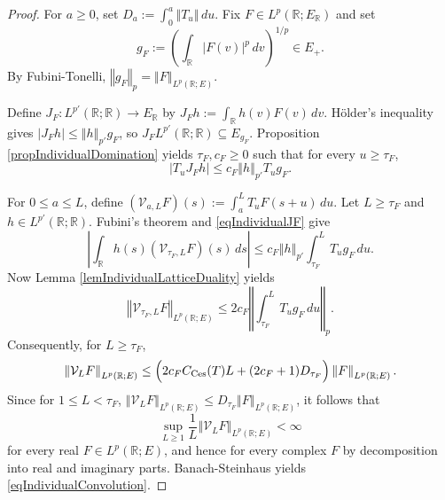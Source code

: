 \documentclass[12pt]{amsart}
\theoremstyle{plain}
\theoremstyle{remark}
\theoremstyle{definition}
\newcommand{\R}{\mathbb{R}}
\newcommand{\norm}[1]{\left\Vert #1\right\Vert}
\begin{document}
	\begin{proof}
		For $a\ge0$, set $D_a:=\int_0^a\norm{T_u}\,du$. Fix $F\in L^p(\R;E_{\R})$ and set 
		\[g_F := \left( \int_{\R}|F(v)|^p\,dv \right)^{1/p} \in E_+.
		\]
		By Fubini-Tonelli, $\norm{g_F}_p=\norm{F}_{L^p(\R;E)}$. 
		
		Define $J_F:L^{p'}(\R;\R)\longrightarrow E_{\R}$ by $J_Fh:=\int_{\R}h(v)F(v)\,dv$. H\"older's inequality gives $|J_Fh| \le \norm{h}_{p'}g_F$, so $J_FL^{p'}(\R;\R)\subseteq E_{g_F}$. Proposition \ref{propIndividualDomination} yields $\tau_F,c_F\ge0$ such that for every $u\ge \tau_F$,
		\begin{equation}\label{eqIndividualJF}
			|T_uJ_Fh| \le c_F\norm{h}_{p'}T_ug_F.
		\end{equation}
		
		For $0\le a\le L$, define $(\mathcal V_{a,L}F)(s) := \int_a^L T_uF(s+u)\,du$. Let $L\ge\tau_F$ and $h\in L^{p'}(\R;\R)$. Fubini's theorem and \eqref{eqIndividualJF} give
		\[
		\left| \int_{\R}h(s)(\mathcal V_{\tau_F,L}F)(s)\,ds \right| \le c_F\norm{h}_{p'} \int_{\tau_F}^L T_ug_F\,du.
		\]
		Now Lemma \ref{lemIndividualLatticeDuality}  yields
		\[
		\norm{\mathcal V_{\tau_F,L}F}_{L^p(\R;E)} \le 2c_F \norm{\int_{\tau_F}^L T_ug_F\,du}_p.
		\]
		Consequently, for $L\ge\tau_F$,
		\[
		\norm{\mathcal V_LF}_{L^p(\R;E)} \le \Bigl( 2c_F C_{\mathrm{Ces}}(T)L + (2c_F+1)D_{\tau_F} \Bigr) \norm{F}_{L^p(\R;E)}.
		\]
		Since for $1\le L<\tau_F$, $\norm{\mathcal V_LF}_{L^p(\R;E)} \le D_{\tau_F}\norm{F}_{L^p(\R;E)}$, it follows that \[
		\sup_{L\ge1} \frac1L \norm{\mathcal V_LF}_{L^p(\R;E)} < \infty
		\]
		for every real $F\in L^p(\R;E)$, and hence for every complex $F$ by decomposition into real and imaginary parts. Banach-Steinhaus yields \eqref{eqIndividualConvolution}.
		\medskip 
		

\end{proof}
\end{document}
